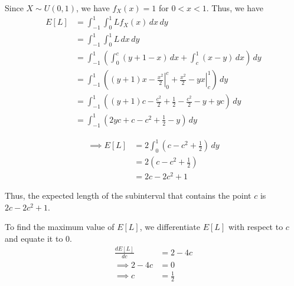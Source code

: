 Since \( X \sim U(0, 1) \), we have \( f_X(x) = 1 \) for \( 0 < x < 1 \).
Thus, we have
\begin{align*}
    E[L]
     & =
    \int_{-1}^{1} \int_{0}^{1} L f_X(x) \, dx \, dy
    \\ & =
    \int_{-1}^{1} \int_{0}^{1} L \, dx \, dy
    \\ & =
    \int_{-1}^{1}
    \left(
    \int_{0}^{c} (y+1-x) \, dx
    +
    \int_{c}^{1} (x-y) \, dx
    \right)
    \, dy
    \\ & =
    \int_{-1}^{1}
    \left(
    \left. (y+1)x - \frac{x^2}{2} \right|_{0}^{c}
    +
    \left. \frac{x^2}{2} - yx \right|_{c}^{1}
    \right)
    \, dy
    \\ & =
    \int_{-1}^{1}
    \left(
    (y+1)c - \frac{c^2}{2}
    +
    \frac{1}{2} - \frac{c^2}{2} - y + yc
    \right)
    \, dy
    \\ & =
    \int_{-1}^{1}
    \left(
    2yc + c - c^2 +\frac{1}{2} - y
    \right)
    \, dy
\end{align*}

\begin{align*}
    \implies
    E[L]
     & =
    2
    \int_{0}^{1}
    \left(
    c - c^2 + \frac{1}{2}
    \right)
    \, dy
    \\ & =
    2
    \left(
    c - c^2 + \frac{1}{2}
    \right)
    \\ & =
    2c - 2c^2 + 1
\end{align*}

Thus, the expected length of the subinterval that contains the point \( c \) is \( 2c - 2c^2 + 1 \).

To find the maximum value of \( E[L] \), we differentiate \( E[L] \) with respect to \( c \) and equate it to \( 0 \).
\begin{align*}
    \frac{dE[L]}{dc}
     & =
    2 - 4c
    \\
    \implies
    2 - 4c
     & =
    0
    \\
    \implies
    c
     & =
    \frac{1}{2}
\end{align*}
